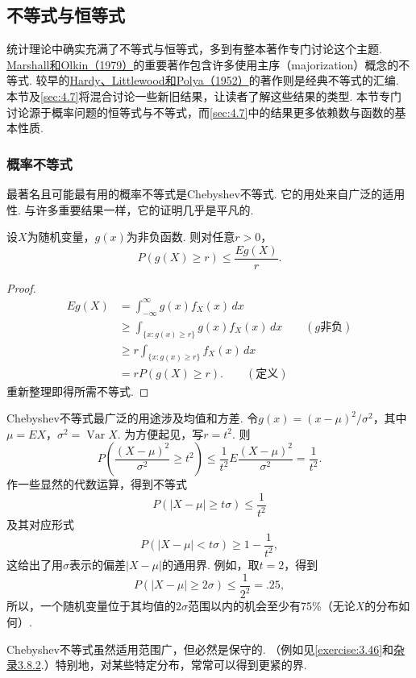 \subsection{不等式与恒等式}\label{sec:3.6}
统计理论中确实充满了不等式与恒等式，多到有整本著作专门讨论这个主题. \hyperref[bib:source214]{Marshall和Olkin（1979）}的重要著作包含许多使用主序（majorization）概念的不等式. 较早的\hyperref[bib:source158]{Hardy、Littlewood和Polya（1952）}的著作则是经典不等式的汇编. 本节及\autoref{sec:4.7}将混合讨论一些新旧结果，让读者了解这些结果的类型. 本节专门讨论源于概率问题的恒等式与不等式，而\autoref{sec:4.7}中的结果更多依赖数与函数的基本性质.

\subsubsection{概率不等式}\label{sec:3.6.1}
最著名且可能最有用的概率不等式是Chebyshev不等式. 它的用处来自广泛的适用性. 与许多重要结果一样，它的证明几乎是平凡的.

\begin{theorem}[Chebyshev不等式]\label{thm:3.6.1}
设$X$为随机变量，$g(x)$为非负函数. 则对任意$r>0$，
$$P(g(X)\ge r)\le\frac{Eg(X)}r.$$
\end{theorem}
\begin{proof}
\begin{align*}
Eg(X)&=\int_{-\infty}^\infty g(x)f_X(x)\,dx\\
&\ge\int_{\{x:g(x)\ge r\}}g(x)f_X(x)\,dx\qquad(g\text{非负})\\
&\ge r\int_{\{x:g(x)\ge r\}}f_X(x)\,dx\\
&=rP(g(X)\ge r).\qquad(\text{定义})
\end{align*}
重新整理即得所需不等式.
\end{proof}

\begin{example}[说明Chebyshev不等式]\label{ex:3.6.2}
Chebyshev不等式最广泛的用途涉及均值和方差. 令$g(x)=(x-\mu)^2/\sigma^2$，其中$\mu=EX$，$\sigma^2=\operatorname{Var}X$. 为方便起见，写$r=t^2$. 则
$$P\left(\frac{(X-\mu)^2}{\sigma^2}\ge t^2\right)\le\frac1{t^2}E\frac{(X-\mu)^2}{\sigma^2}=\frac1{t^2}.$$
作一些显然的代数运算，得到不等式
$$P(|X-\mu|\ge t\sigma)\le\frac1{t^2}$$
及其对应形式
$$P(|X-\mu|<t\sigma)\ge1-\frac1{t^2},$$
这给出了用$\sigma$表示的偏差$|X-\mu|$的通用界. 例如，取$t=2$，得到
$$P(|X-\mu|\ge2\sigma)\le\frac1{2^2}=.25,$$
所以，一个随机变量位于其均值的$2\sigma$范围以内的机会至少有75\%（无论$X$的分布如何）.
\end{example}
Chebyshev不等式虽然适用范围广，但必然是保守的. （例如见\autoref{exercise:3.46}和\hyperref[sec:3.8.2]{杂录3.8.2}.）特别地，对某些特定分布，常常可以得到更紧的界.


